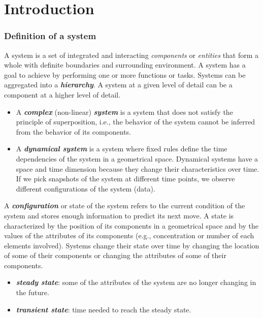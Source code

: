 \graphicspath{{chapters/07/images/}}
\chapter{Introduction}

\subsection{Definition of a system}
A system is a set of integrated and interacting \emph{components} or \emph{entities} that form a whole with definite boundaries and surrounding environment.
A system has a goal to achieve by performing one or more functions or tasks.
Systems can be aggregated into a \textbf{\emph{hierarchy}}.
A system at a given level of detail can be a component at a higher level of detail.

\begin{itemize}
\item A \textbf{\emph{complex}} (non-linear) \textbf{\emph{system}} is a system that does not satisfy the principle of superposition, i.e., the behavior of the system cannot be inferred from the behavior of its components.
\item A \textbf{\emph{dynamical system}} is a system where fixed rules define the time dependencies of the system in a geometrical space.
  Dynamical systems have a space and time dimension because they change their characteristics over time.
  If we pick snapshots of the system at different time points, we observe different configurations of the system (data).
\end{itemize}
\noindent
A \textbf{\emph{configuration}} or state of the system refers to the current condition of the system and stores enough information to predict its next move.
A state is characterized by the position of its components in a geometrical space and by the values of the attributes of its components (e.g., concentration or number of each elements involved).
Systems change their state over time by changing the location of some of their components or changing the attributes of some of their components.

\begin{itemize}
  \item \textbf{\emph{steady state}}: some of the attributes of the system are no longer changing in the future.
  \item \textbf{\emph{transient state}}: time needed to reach the steady state.
\end{itemize}


